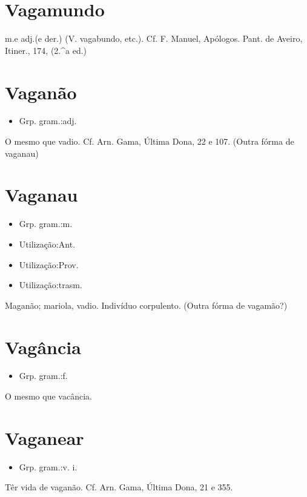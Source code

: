\documentclass{article}
\begin{document}
\section{Vagamundo}
\textunderscore m.\textunderscore  e \textunderscore adj.\textunderscore  (e der.)
(V. \textunderscore vagabundo\textunderscore , etc.). Cf. F. Manuel, \textunderscore Apólogos\textunderscore . Pant. de Aveiro, \textunderscore Itiner.\textunderscore , 174, (2.^a ed.)
\section{Vaganão}
\begin{itemize}
\item {Grp. gram.:adj.}
\end{itemize}
O mesmo que \textunderscore vadio\textunderscore . Cf. Arn. Gama, \textunderscore Última Dona\textunderscore , 22 e 107.
(Outra fórma de \textunderscore vaganau\textunderscore )
\section{Vaganau}
\begin{itemize}
\item {Grp. gram.:m.}
\end{itemize}
\begin{itemize}
\item {Utilização:Ant.}
\end{itemize}
\begin{itemize}
\item {Utilização:Prov.}
\end{itemize}
\begin{itemize}
\item {Utilização:trasm.}
\end{itemize}
Maganão; mariola, vadio.
Indivíduo corpulento.
(Outra fórma de \textunderscore vagamão\textunderscore ?)
\section{Vagância}
\begin{itemize}
\item {Grp. gram.:f.}
\end{itemize}
O mesmo que \textunderscore vacância\textunderscore .
\section{Vaganear}
\begin{itemize}
\item {Grp. gram.:v. i.}
\end{itemize}
Têr vida de vaganão. Cf. Arn. Gama, \textunderscore Última Dona\textunderscore , 21 e 355.
\end{document}

